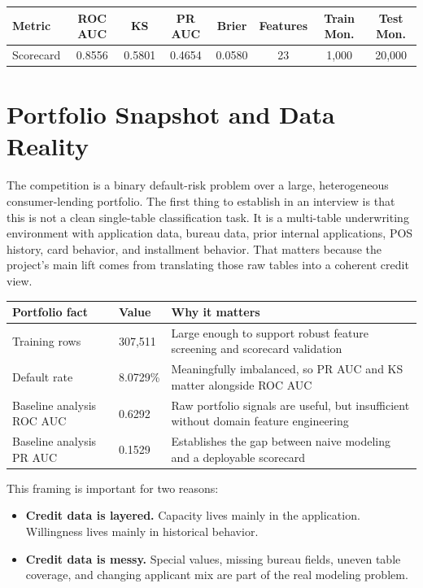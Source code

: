 \documentclass[11pt]{article}
\begin{document}
\begin{center}
\begin{tabular}{@{}lccccccc@{}}
\toprule
Metric & ROC AUC & KS & PR AUC & Brier & Features & Train Mon. & Test Mon. \\
\midrule
Scorecard & 0.8556 & 0.5801 & 0.4654 & 0.0580 & 23 & 1{,}000 & 20{,}000 \\
\bottomrule
\end{tabular}
\end{center}

\section{Portfolio Snapshot and Data Reality}

The competition is a binary default-risk problem over a large, heterogeneous consumer-lending portfolio. The first thing to establish in an interview is that this is not a clean single-table classification task. It is a multi-table underwriting environment with application data, bureau data, prior internal applications, POS history, card behavior, and installment behavior. That matters because the project's main lift comes from translating those raw tables into a coherent credit view.

\begin{center}
{\small
\begin{tabularx}{\textwidth}{@{}P{0.24\textwidth}P{0.12\textwidth}Y@{}}
\toprule
Portfolio fact & Value & Why it matters \\
\midrule
Training rows & 307{,}511 & Large enough to support robust feature screening and scorecard validation \\
Default rate & 8.0729\% & Meaningfully imbalanced, so PR AUC and KS matter alongside ROC AUC \\
Baseline analysis ROC AUC & 0.6292 & Raw portfolio signals are useful, but insufficient without domain feature engineering \\
Baseline analysis PR AUC & 0.1529 & Establishes the gap between naive modeling and a deployable scorecard \\
\bottomrule
\end{tabularx}
}
\end{center}

This framing is important for two reasons:

\begin{itemize}
  \item \textbf{Credit data is layered.} Capacity lives mainly in the application. Willingness lives mainly in historical behavior.
  \item \textbf{Credit data is messy.} Special values, missing bureau fields, uneven table coverage, and changing applicant mix are part of the real modeling problem.
\end{itemize}
\end{document}
